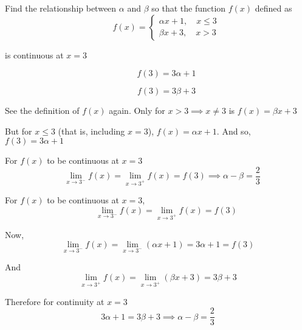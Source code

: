 \documentclass[14pt,fleqn]{extarticle}
\begin{document}
Find the relationship between $\alpha$ and $\beta$ so
that the function $f(x)$ defined as
%
\[\qquad f(x) = \begin{cases} 
\alpha x + 1,\quad  x\leq 3 \\
\beta x + 3,  \quad  x > 3
\end{cases} \]

is continuous at $x=3$
%

\newcard

\[ \qquad f(3) = 3\alpha + 1 \]

\newcard 

\[ \qquad f(3) = 3\beta + 3 \]

\newcard 

See the definition of $f(x)$ again. Only for $x > 3 \implies x\neq 3$ is $f(x) = \beta x + 3$\newline 

But for $x \leq 3$ (that is, including $x=3$), $f(x) = \alpha x + 1$. And so, $f(3) = 3\alpha + 1$

\newcard 

For $f(x)$ to be continuous at $x=3$ 
\small\[ \quad \lim_{x\to 3^-} f(x) = \lim_{x\to 3^+} f(x) = f(3) \implies \alpha - \beta = \frac{2}{3}\]\normalsize 

\newcard 

For $f(x)$ to be continuous at $x=3$, 
\[ \qquad \lim_{x\to 3^-} f(x) = \lim_{x\to 3^+} f(x) = f(3) \]

Now, \[\lim_{x\to 3^-} f(x) = \lim_{x\to 3^-} \left(\alpha x + 1 \right) = 3\alpha + 1 = f(3) \]

And 
\[\lim_{x\to 3^+} f(x) = \lim_{x\to 3^+} \left(\beta x + 3 \right) = 3\beta + 3\]

Therefore  for continuity at $x=3$
\[ 3\alpha + 1 = 3\beta + 3 \implies \alpha - \beta = \frac{2}{3}\]
\end{document}
